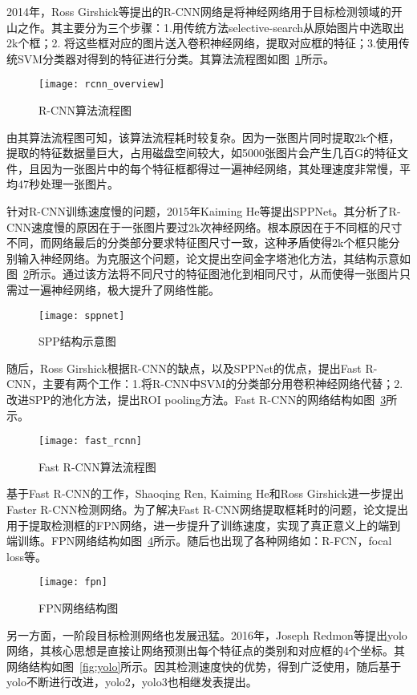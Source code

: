 2014年，Ross Girshick等提出的R-CNN网络是将神经网络用于目标检测领域的开山之作。其主要分为三个步骤：1.用传统方法selective-search从原始图片中选取出2k个框；2. 将这些框对应的图片送入卷积神经网络，提取对应框的特征；3.使用传统SVM分类器对得到的特征进行分类。其算法流程图如图~\ref{fig:rcnn_overview}所示。

\begin{figure}[htp]
\centering
\texttt{[image: rcnn\_overview]}
\caption{R-CNN算法流程图}
\label{fig:rcnn_overview}
\end{figure}
由其算法流程图可知，该算法流程耗时较复杂。因为一张图片同时提取2k个框，提取的特征数据量巨大，占用磁盘空间较大，如5000张图片会产生几百G的特征文件，且因为一张图片中的每个特征框都得过一遍神经网络，其处理速度非常慢，平均47秒处理一张图片。

针对R-CNN训练速度慢的问题，2015年Kaiming He等提出SPPNet。其分析了R-CNN速度慢的原因在于一张图片要过2k次神经网络。根本原因在于不同框的尺寸不同，而网络最后的分类部分要求特征图尺寸一致，这种矛盾使得2k个框只能分别输入神经网络。为克服这个问题，论文提出空间金字塔池化方法，其结构示意如图~\ref{fig:sppnet}所示。通过该方法将不同尺寸的特征图池化到相同尺寸，从而使得一张图片只需过一遍神经网络，极大提升了网络性能。

\begin{figure}[htp]
\centering
\texttt{[image: sppnet]}
\caption{SPP结构示意图}
\label{fig:sppnet}
\end{figure}
随后，Ross Girshick根据R-CNN的缺点，以及SPPNet的优点，提出Fast R-CNN，主要有两个工作：1.将R-CNN中SVM的分类部分用卷积神经网络代替；2.改进SPP的池化方法，提出ROI pooling方法。Fast R-CNN的网络结构如图~\ref{fig:fast_rcnn}所示。

\begin{figure}[htp]
\centering
\texttt{[image: fast\_rcnn]}
\caption{Fast R-CNN算法流程图}
\label{fig:fast_rcnn}
\end{figure}
基于Fast R-CNN的工作，Shaoqing Ren, Kaiming He和Ross Girshick进一步提出Faster R-CNN检测网络。为了解决Fast R-CNN网络提取框耗时的问题，论文提出用于提取检测框的FPN网络，进一步提升了训练速度，实现了真正意义上的端到端训练。FPN网络结构如图~\ref{fig:fpn}所示。随后也出现了各种网络如：R-FCN，focal loss等。

\begin{figure}[htp]
\centering
\texttt{[image: fpn]}
\caption{FPN网络结构图}
\label{fig:fpn}
\end{figure}
另一方面，一阶段目标检测网络也发展迅猛。2016年，Joseph Redmon等提出yolo网络，其核心思想是直接让网络预测出每个特征点的类别和对应框的4个坐标。其网络结构如图~\ref{fig:yolo}所示。因其检测速度快的优势，得到广泛使用，随后基于yolo不断进行改进，yolo2，yolo3也相继发表提出。

